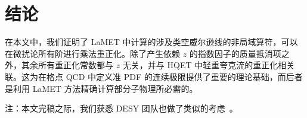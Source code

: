 \section{结论}
在本文中，我们证明了 LaMET 中计算的涉及类空威尔逊线的非局域算符，可以在微扰论所有阶进行乘法重正化。除了产生依赖 $z$ 的指数因子的质量抵消项之外，其余所有重正化常数都与 $z$ 无关，并与 HQET 中轻重夸克流的重正化相关联。这为在格点 QCD 中定义准 PDF 的连续极限提供了重要的理论基础，而后者是利用 LaMET 方法精确计算部分子物理所必需的。

注：本文完稿之际，我们获悉 DESY 团队也做了类似的考虑~\cite{greentalk}。
